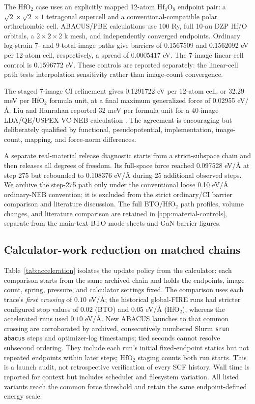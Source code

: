 \documentclass[final,5p,times,twocolumn]{elsarticle}
\begin{document}
The HfO$_2$ case uses an explicitly mapped 12-atom Hf$_4$O$_8$ endpoint pair:
a $\sqrt{2}\times\sqrt{2}\times1$ tetragonal supercell and a
conventional-compatible polar orthorhombic cell. ABACUS/PBE calculations use
100 Ry, full 10-au DZP Hf/O orbitals, a $2\times2\times2$ k mesh, and
independently converged endpoints. Ordinary log-strain 7- and 9-total-image
paths give barriers of 0.1567509 and 0.1562092 eV per 12-atom cell,
respectively, a spread of 0.0005417 eV. The 7-image linear-cell control is
0.1596772 eV. These controls are reported separately: the linear-cell path
tests interpolation sensitivity rather than image-count convergence.

The staged 7-image CI refinement gives 0.1291722 eV per 12-atom cell, or
32.29 meV per HfO$_2$ formula unit, at a final maximum generalized force of
0.02955 eV/\AA{}. Liu and Hanrahan reported 32 meV per formula unit for a
40-image LDA/QE/USPEX VC-NEB calculation \cite{Liu2019}. The agreement is
encouraging but deliberately qualified by functional, pseudopotential,
implementation, image-count, mapping, and force-norm differences.

A separate real-material release diagnostic starts from a strict-subspace
chain and then releases all degrees of freedom.  Its full-space force reached
0.097528 eV/\AA{} at step 275 but rebounded to 0.108376 eV/\AA{} during 25
additional observed steps.  We archive the step-275 path only under the
conventional loose 0.10 eV/\AA{} ordinary-NEB convention; it is excluded from
the strict ordinary/CI barrier comparison and literature discussion.
The full BTO/HfO$_2$ path profiles, volume changes, and literature comparison
are retained in \ref{app:material-controls}, separate from the
main-text BTO mode sheets and GaN barrier figures.

\subsection{Calculator-work reduction on matched chains}
\label{sec:efficiency}

Table~\ref{tab:acceleration} isolates the update policy from the calculator:
each comparison starts from the same archived chain and holds the endpoints,
image count, spring, pressure, and calculator settings fixed. The comparison
uses each trace's \emph{first crossing} of $0.10$ eV/\AA{}; the historical
global-FIRE runs had stricter configured stop values of $0.02$ (BTO) and
$0.05$ eV/\AA{} (HfO$_2$), whereas the accelerated runs used $0.10$
eV/\AA{}. New ABACUS launches to that common crossing are
corroborated by archived, consecutively numbered Slurm
\texttt{srun abacus} steps and optimizer-log timestamps; tied seconds cannot
resolve subsecond ordering. They
include each run's initial fixed-endpoint statics but not repeated endpoints
within later steps; HfO$_2$ staging counts both run starts. This is a launch
audit, not retrospective verification of every SCF history. Wall time is reported for
context but includes scheduler and filesystem variation.
All listed variants reach the common force threshold and retain the same
endpoint-defined energy scale.
\end{document}
